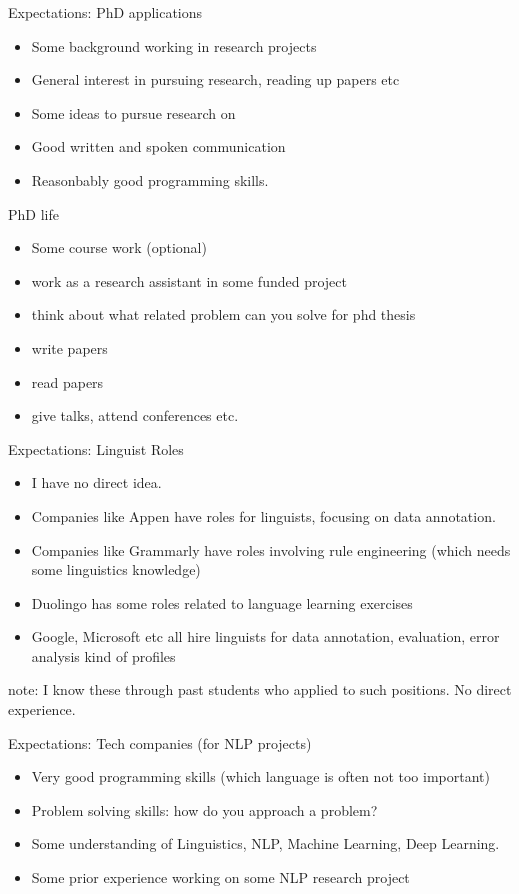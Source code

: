 \documentclass{beamer}
\begin{document}
\begin{frame}{Expectations: PhD applications}
    \begin{itemize}
        \item Some background working in research projects
        \item General interest in pursuing research, reading up papers etc
        \item Some ideas to pursue research on
        \item Good written and spoken communication
        \item Reasonbably good programming skills.
    \end{itemize}
\end{frame}

\begin{frame}{PhD life}
\begin{itemize}
    \item Some course work (optional)
    \item work as a research assistant in some funded project
    \item think about what related problem can you solve for phd thesis
    \item write papers
    \item read papers
    \item give talks, attend conferences etc.
\end{itemize}
\end{frame}

\begin{frame}{Expectations: Linguist Roles}
    \begin{itemize}
        \item I have no direct idea.
        \item Companies like Appen have roles for linguists, focusing on data annotation.
        \item Companies like Grammarly have roles involving rule engineering (which needs some linguistics knowledge)
        \item Duolingo has some roles related to language learning exercises 
        \item Google, Microsoft etc all hire linguists for data annotation, evaluation, error analysis kind of profiles
    \end{itemize}
    note: I know these through past students who applied to such positions. No direct experience.
\end{frame}

\begin{frame}{Expectations: Tech companies}
(for NLP projects)
    \begin{itemize}
        \item Very good programming skills (which language is often not too important)
        \item Problem solving skills: how do you approach a problem? 
        \item Some understanding of Linguistics, NLP, Machine Learning, Deep Learning. 
        \item Some prior experience working on some NLP research project
    \end{itemize}
\end{frame}
\end{document}
